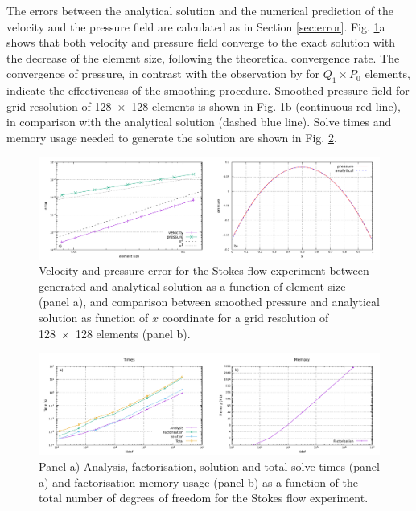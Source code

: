 \documentclass[hidelinks,11pt,a4paper]{article}
\begin{document}
The errors between the analytical solution and the numerical prediction of the velocity and the pressure field are calculated as in Section \ref{sec:error}. Fig. \ref{fig:errors}a shows that both velocity and pressure field converge to the exact solution with the decrease of the element size, following the theoretical convergence rate. The convergence of pressure, in contrast with the observation by \citet{Donea2003} for $Q_1 \times P_0$ elements, indicate the effectiveness of the smoothing procedure. Smoothed pressure field for grid resolution of \num{128x128} elements is shown in Fig. \ref{fig:errors}b (continuous red line), in comparison with the analytical solution (dashed blue line). Solve times and memory usage needed to generate the solution are shown in Fig. \ref{fig:MUMPS}.

\begin{figure}
\centering
\noindent\includegraphics[width=\textwidth]{./Figures/errors.pdf}
\caption{Velocity and pressure error for the Stokes flow experiment between generated and analytical solution as a function of element size (panel a), and comparison between smoothed pressure and analytical solution as function of $x$ coordinate for a grid resolution of \num{128x128} elements (panel b).}
\label{fig:errors}
\end{figure}

\begin{figure}
\noindent\includegraphics[width=\textwidth]{./Figures/MUMPS.pdf}
\caption{Panel a) Analysis, factorisation, solution and total solve times (panel a) and factorisation memory usage (panel b) as a function of the total number of degrees of freedom for the Stokes flow experiment.}
\label{fig:MUMPS}
\end{figure}
\end{document}
